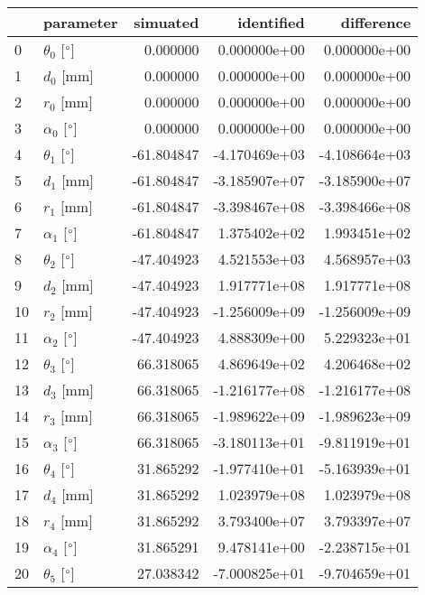 \documentclass{standalone}%
\begin{document}
%
\normalsize%
\begin{tabular}{llrrr}
\toprule
{} &                 parameter &   simuated &    identified &    difference \\
\midrule
0  &  $\theta_{0}$ [$\degree$] &   0.000000 &  0.000000e+00 &  0.000000e+00 \\
1  &              $d_{0}$ [mm] &   0.000000 &  0.000000e+00 &  0.000000e+00 \\
2  &              $r_{0}$ [mm] &   0.000000 &  0.000000e+00 &  0.000000e+00 \\
3  &  $\alpha_{0}$ [$\degree$] &   0.000000 &  0.000000e+00 &  0.000000e+00 \\
4  &  $\theta_{1}$ [$\degree$] & -61.804847 & -4.170469e+03 & -4.108664e+03 \\
5  &              $d_{1}$ [mm] & -61.804847 & -3.185907e+07 & -3.185900e+07 \\
6  &              $r_{1}$ [mm] & -61.804847 & -3.398467e+08 & -3.398466e+08 \\
7  &  $\alpha_{1}$ [$\degree$] & -61.804847 &  1.375402e+02 &  1.993451e+02 \\
8  &  $\theta_{2}$ [$\degree$] & -47.404923 &  4.521553e+03 &  4.568957e+03 \\
9  &              $d_{2}$ [mm] & -47.404923 &  1.917771e+08 &  1.917771e+08 \\
10 &              $r_{2}$ [mm] & -47.404923 & -1.256009e+09 & -1.256009e+09 \\
11 &  $\alpha_{2}$ [$\degree$] & -47.404923 &  4.888309e+00 &  5.229323e+01 \\
12 &  $\theta_{3}$ [$\degree$] &  66.318065 &  4.869649e+02 &  4.206468e+02 \\
13 &              $d_{3}$ [mm] &  66.318065 & -1.216177e+08 & -1.216177e+08 \\
14 &              $r_{3}$ [mm] &  66.318065 & -1.989622e+09 & -1.989623e+09 \\
15 &  $\alpha_{3}$ [$\degree$] &  66.318065 & -3.180113e+01 & -9.811919e+01 \\
16 &  $\theta_{4}$ [$\degree$] &  31.865292 & -1.977410e+01 & -5.163939e+01 \\
17 &              $d_{4}$ [mm] &  31.865292 &  1.023979e+08 &  1.023979e+08 \\
18 &              $r_{4}$ [mm] &  31.865292 &  3.793400e+07 &  3.793397e+07 \\
19 &  $\alpha_{4}$ [$\degree$] &  31.865291 &  9.478141e+00 & -2.238715e+01 \\
20 &  $\theta_{5}$ [$\degree$] &  27.038342 & -7.000825e+01 & -9.704659e+01 \\

\end{tabular}
\end{document}
